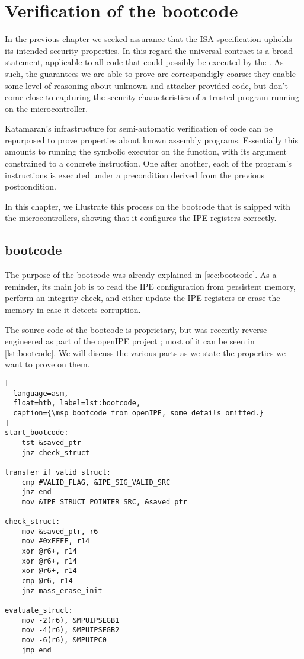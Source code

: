 \chapter{Verification of the \texorpdfstring{\msp}{MSP430} bootcode}
\label{ch:block-verifier}

In the previous chapter we seeked assurance that the \msp ISA specification upholds its intended security properties. In this regard the universal contract is a broad statement, applicable to all code that could possibly be executed by the \msp. As such, the guarantees we are able to prove are correspondigly coarse: they enable some level of reasoning about unknown and attacker-provided code, but don't come close to capturing the security characteristics of a trusted program running on the microcontroller.

Katamaran's infrastructure for semi-automatic verification of \usail code can be repurposed to prove properties about known assembly programs. Essentially this amounts to running the symbolic executor on the  function, with its argument constrained to a concrete instruction. One after another, each of the program's instructions is executed under a precondition derived from the previous postcondition.

In this chapter, we illustrate this process on the bootcode that is shipped with the \msp microcontrollers, showing that it configures the IPE registers correctly.

\section{\msp bootcode}

The purpose of the bootcode was already explained in \cref{sec:bootcode}. As a reminder, its main job is to read the IPE configuration from persistent memory, perform an integrity check, and either update the IPE registers or erase the memory in case it detects corruption.

The source code of the bootcode is proprietary, but was recently reverse-engineered as part of the openIPE project \cite{Bognar2025}; most of it can be seen in \cref{lst:bootcode}. We will discuss the various parts as we state the properties we want to prove on them.

\begin{lstlisting}[
  language=asm,
  float=htb, label=lst:bootcode,
  caption={\msp bootcode from openIPE, some details omitted.}
]
start_bootcode:
    tst &saved_ptr
    jnz check_struct

transfer_if_valid_struct:
    cmp #VALID_FLAG, &IPE_SIG_VALID_SRC
    jnz end
    mov &IPE_STRUCT_POINTER_SRC, &saved_ptr

check_struct:
    mov &saved_ptr, r6
    mov #0xFFFF, r14
    xor @r6+, r14
    xor @r6+, r14
    xor @r6+, r14
    cmp @r6, r14
    jnz mass_erase_init

evaluate_struct:
    mov -2(r6), &MPUIPSEGB1
    mov -4(r6), &MPUIPSEGB2
    mov -6(r6), &MPUIPC0
    jmp end
\end{lstlisting}

